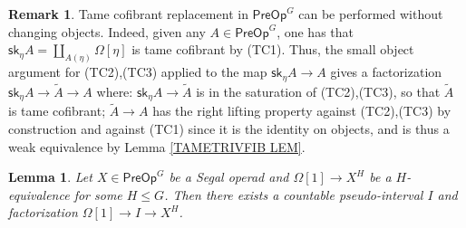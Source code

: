 \documentclass[a4paper,10pt
,draft
]{article}%
\numberwithin{equation}{section}
\numberwithin{figure}{section}
\newtheorem{lemma}[equation]{Lemma}%
\theoremstyle{definition} %
\newtheorem{remark}[equation]{Remark}%
\newcommand{\1}{\ensuremath{\mathbbm 1}}%
\begin{document}
\begin{remark}\label{TC2TC3REP REM}
	Tame cofibrant replacement in $\mathsf{PreOp}^G$
	can be performed without changing objects.
	Indeed, given any 
	$A \in \mathsf{PreOp}^G$,
	one has that
	$\mathsf{sk}_{\eta} A = 
	\coprod_{A(\eta)} \Omega[\eta]$
	is tame cofibrant by (TC1).
	Thus, the small object argument for (TC2),(TC3) 
	applied to the map 
	$\mathsf{sk}_{\eta} A \to A$
	gives a factorization
	$\mathsf{sk}_{\eta} A \to \widetilde{A} \to A$
	where:
	$\mathsf{sk}_{\eta} A \to \widetilde{A}$
	is in the saturation of (TC2),(TC3), so that
	$\widetilde{A}$ is tame cofibrant;
	$\widetilde{A} \to A$
	has the right lifting property against 
	(TC2),(TC3) by construction and against (TC1)
	since it is the identity on objects, 
	and is thus a weak equivalence by 
	Lemma \ref{TAMETRIVFIB LEM}.
\end{remark}



\begin{lemma}\label{SLIMOD LEM}
	Let $X \in \mathsf{PreOp}^G$
	be a Segal operad
	and $\Omega[1] \to X^H$
	be a $H$-equivalence for some $H \leq G$.
	Then there exists a countable
	pseudo-interval $I$
	and factorization
	$\Omega[1] \to I \to X^H$.
\end{lemma}
\end{document}
